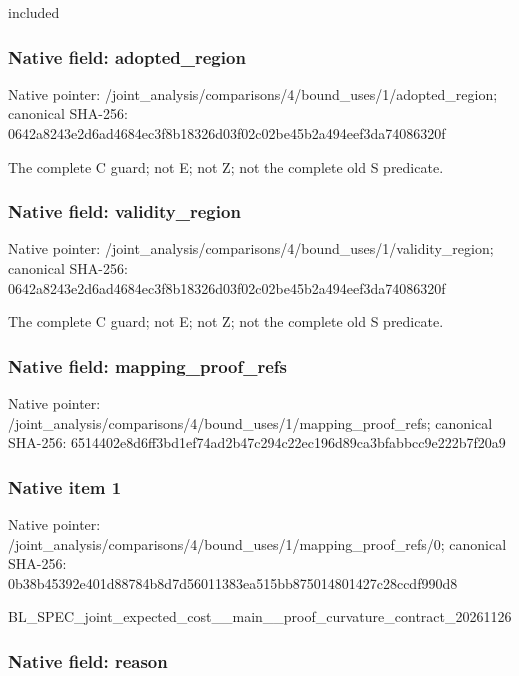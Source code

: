 \documentclass[10pt,a4paper]{article}
\begin{document}
included


\subsubsection{Native field: adopted\_region}


Native pointer: /joint\_analysis/comparis\allowbreak{}ons/4/bound\_uses/1/adopt\allowbreak{}ed\_region; canonical SHA-256: 0642a8243e2d6ad4684ec3f8\allowbreak{}b18326d03f02c02be45b2a49\allowbreak{}4eef3da74086320f


The complete C guard; not E; not Z; not the complete old S predicate.


\subsubsection{Native field: validity\_region}


Native pointer: /joint\_analysis/comparis\allowbreak{}ons/4/bound\_uses/1/valid\allowbreak{}ity\_region; canonical SHA-256: 0642a8243e2d6ad4684ec3f8\allowbreak{}b18326d03f02c02be45b2a49\allowbreak{}4eef3da74086320f


The complete C guard; not E; not Z; not the complete old S predicate.


\subsubsection{Native field: mapping\_proof\_refs}


Native pointer: /joint\_analysis/comparis\allowbreak{}ons/4/bound\_uses/1/mappi\allowbreak{}ng\_proof\_refs; canonical SHA-256: 6514402e8d6ff3bd1ef74ad2\allowbreak{}b47c294c22ec196d89ca3bfa\allowbreak{}bbcc9e222b7f20a9



\subsubsection{Native item 1}


Native pointer: /joint\_analysis/comparis\allowbreak{}ons/4/bound\_uses/1/mappi\allowbreak{}ng\_proof\_refs/0; canonical SHA-256: 0b38b45392e401d88784b8d7\allowbreak{}d56011383ea515bb87501480\allowbreak{}1427c28ccdf990d8


BL\_SPEC\_joint\_expected\_c\allowbreak{}ost\_\_main\_\_proof\_curvatu\allowbreak{}re\_contract\_20261126


\subsubsection{Native field: reason}
\end{document}
